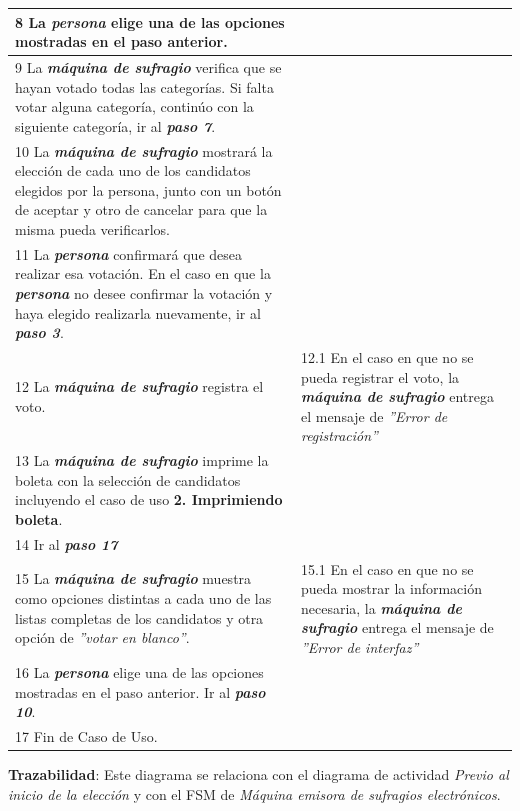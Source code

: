 \documentclass[spanish, 10pt,a4paper]{article}
\numberwithin{equation}{section} %
\begin{document}
\begin{table}[H]
\begin{tabular}{p{9cm} | p{7cm}}
    \hline
    8 La \textbf{\textit{persona}} elige una de las opciones mostradas en el paso anterior.
    & \\
    
    \hline
    9 La \textbf{\textit{máquina de sufragio}} verifica que se hayan votado todas las categorías. Si falta votar alguna categoría, continúo con la siguiente categoría, ir al \textbf{\textit{paso 7}}.
    & \\
    
    \hline
    10 La \textbf{\textit{máquina de sufragio}} mostrará la elección de cada uno de los candidatos elegidos por la persona, junto con un botón de aceptar y otro de cancelar para que la misma pueda verificarlos.
    & \\
    
    \hline
    11 La \textbf{\textit{persona}} confirmará que desea realizar esa votación.
     En el caso en que la \textbf{\textit{persona}} no desee confirmar la votación y haya elegido realizarla nuevamente, ir al \textbf{\textit{paso 3}}.\\
    
    \hline
    12 La \textbf{\textit{máquina de sufragio}} registra el voto.
    & 
    12.1 En el caso en que no se pueda registrar el voto, la \textbf{\textit{máquina de sufragio}} entrega el mensaje de \textit{''Error de registración''}
    \\
    
    \hline
    13 La \textbf{\textit{máquina de sufragio}} imprime la boleta con la selección de candidatos incluyendo el caso de uso \textbf{2. Imprimiendo boleta}.
    & 
    \\
    
    \hline
    14 Ir al  \textbf{\textit{paso 17}}
    & \\
    
    \hline
    15 La \textbf{\textit{máquina de sufragio}} muestra como opciones distintas a cada uno de las listas completas de los candidatos y otra opción de \textit{''votar en blanco''}.
    & 
    15.1 En el caso en que no se pueda mostrar la información necesaria, la \textbf{\textit{máquina de sufragio}} entrega el mensaje de \textit{''Error de interfaz''}
    \\
    
    \hline
    16 La \textbf{\textit{persona}} elige una de las opciones mostradas en el paso anterior. Ir al \textbf{\textit{paso 10}}.
    & \\
    \hline

    \hline
    17 Fin de Caso de Uso.
    & \\
  \end{tabular}
\egroup
\end{table}
\vspace{-10px}
\noindent\textbf{Trazabilidad}: Este diagrama se relaciona con el diagrama de actividad \textit{Previo al inicio de la elección} y con el FSM de \textit{Máquina emisora de sufragios electrónicos}.
\end{document}
